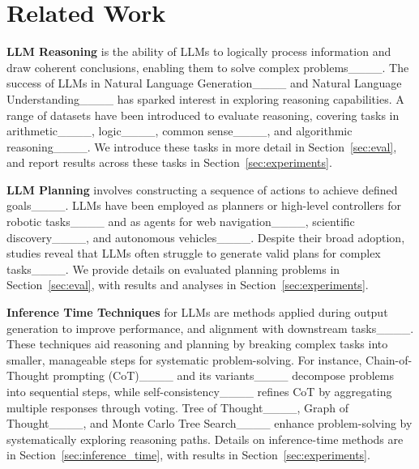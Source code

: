 \section{Related Work}
\label{sec:related}
\textbf{LLM Reasoning} is the ability of LLMs to logically process information and draw coherent conclusions, enabling them to solve complex problems____. The success of LLMs in Natural Language Generation____ and Natural Language Understanding____ has sparked interest in exploring reasoning capabilities. A range of datasets have been introduced to evaluate reasoning, covering tasks in arithmetic____, logic____, common sense____, and algorithmic reasoning____. We introduce these tasks in more detail in 
Section~\ref{sec:eval}, and report results across these tasks in Section~\ref{sec:experiments}.


\textbf{LLM Planning} involves constructing a sequence of actions to achieve defined goals____. LLMs have been employed as planners or high-level controllers for robotic tasks____ and as agents for web navigation____, scientific discovery____, and autonomous vehicles____. Despite their broad adoption, studies reveal that LLMs often struggle to generate valid plans for complex  tasks____. We provide details on evaluated planning problems in Section~\ref{sec:eval}, with results and analyses in Section~\ref{sec:experiments}.

\textbf{Inference Time Techniques} %
for LLMs are methods applied during output generation to improve performance, and alignment with downstream tasks____. These techniques aid reasoning and planning by breaking complex tasks into smaller, manageable steps for systematic problem-solving. For instance, Chain-of-Thought prompting (CoT)____ and its variants____ decompose problems into sequential steps, while self-consistency____ refines CoT by aggregating multiple responses through voting. Tree of Thought____, Graph of Thought____, and Monte Carlo Tree Search____ enhance problem-solving by systematically exploring reasoning paths. Details on inference-time methods are in Section~\ref{sec:inference_time}, with results in Section~\ref{sec:experiments}.